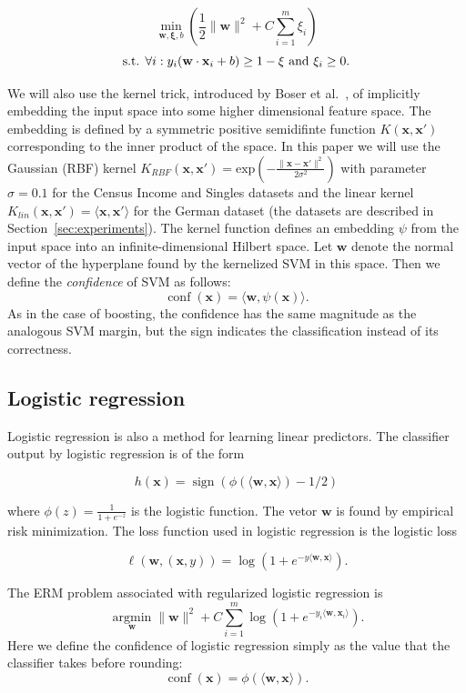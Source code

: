 \documentclass[conference]{IEEEtran}
\DeclareMathOperator{\sign}{sign}
\DeclareMathOperator{\conf}{conf}
\DeclareMathOperator{\argmin}{argmin}
\begin{document}
$$\min_{\mathbf w,\mathbf \xi, b} \left(\frac12\|\mathbf w\|^2+C\sum_{i=1}^m \xi_i\right)$$
$$\textnormal{s.t. } \forall i: y_i(\mathbf w\cdot \mathbf x_i +b)\ge 1-\xi \textnormal{ and } \xi_i\ge 0.$$

We will also use the kernel trick, introduced by Boser et al.~\cite{BoserGV92},
of implicitly embedding the input space into some higher dimensional feature
space.  The embedding is defined by a symmetric positive semidifinte function
$K(\mathbf x,\mathbf x')$ corresponding to the inner product of the space. In
this paper we will use the Gaussian (RBF) kernel $K_{RBF}(\mathbf x,\mathbf x')
=\mathrm{exp}\left(-\frac{\|\mathbf x-\mathbf x'\|^2}{2\sigma^2}\right)$ with
parameter $\sigma=0.1$ for the Census Income and Singles datasets and the
linear kernel $K_{lin}(\mathbf x,\mathbf x') =\langle\mathbf x,\mathbf
x' \rangle$ for the German dataset (the datasets are described in
Section~\ref{sec:experiments}).  The kernel function defines an embedding
$\psi$ from the input space into an infinite-dimensional Hilbert space.  Let
$\mathbf w$ denote the normal vector of the hyperplane found by the kernelized
SVM in this space.  Then we define the \emph{confidence} of SVM as follows:
$$\conf(\mathbf x) = \langle \mathbf w, \psi(\mathbf x)\rangle.$$ As in the
case of boosting, the confidence has the same magnitude as the analogous SVM
margin, but the sign indicates the classification instead of its correctness.

\subsection{Logistic regression}

Logistic regression is also a method for learning linear predictors.  The
classifier output by logistic regression is of the form

$$h(\mathbf x)=\sign(\phi(\langle \mathbf w, \mathbf x\rangle) - 1/2)$$

where $\phi(z)=\frac{1}{1+e^{-z}}$ is the logistic function. The vetor $\mathbf
w$ is found by empirical risk minimization. The loss function used in logistic
regression is the logistic loss

$$\ell(\mathbf w, (\mathbf x,y))=\log(1+e^{-y\langle \mathbf w, \mathbf x\rangle}).$$

The ERM problem associated with regularized logistic regression is 
$$
   \argmin\limits_{\mathbf w} \|\mathbf w\|^2+ C 
      \sum_{i=1}^m \log(1+e^{-y_i\langle \mathbf w, \mathbf x_i\rangle}).
$$
Here we define the confidence of logistic regression simply as the value that
the classifier takes before rounding:
$$\conf(\mathbf x) = \phi(\langle \mathbf w, \mathbf x\rangle).$$
\end{document}
